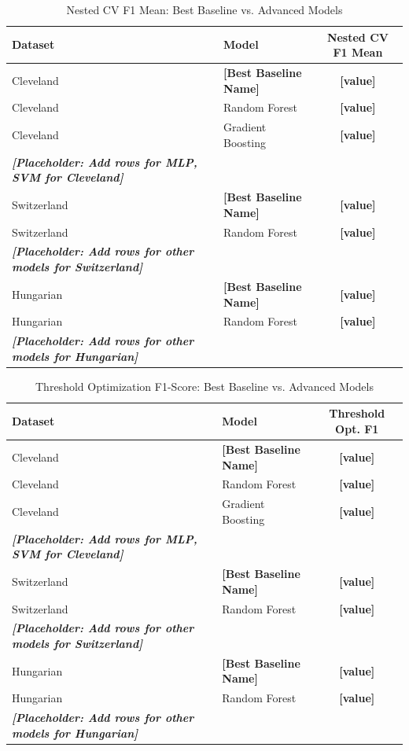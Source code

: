 \documentclass{article}
\begin{document}
\begin{table}[htbp] %
\centering
\caption{Nested CV F1 Mean: Best Baseline vs. Advanced Models}
\label{tab:advanced_comparison_nested}
\begin{tabular}{llc}
\toprule
Dataset     & Model                & Nested CV F1 Mean \\
\midrule
Cleveland   & \textbf{[Best Baseline Name]} & \textbf{[value]}    \\
Cleveland   & Random Forest        & \textbf{[value]}    \\
Cleveland   & Gradient Boosting    & \textbf{[value]}    \\
\textit{\textbf{[Placeholder: Add rows for MLP, SVM for Cleveland]}} & & \\
\midrule
Switzerland & \textbf{[Best Baseline Name]} & \textbf{[value]}    \\
Switzerland & Random Forest        & \textbf{[value]}    \\
\textit{\textbf{[Placeholder: Add rows for other models for Switzerland]}} & & \\
\midrule
Hungarian   & \textbf{[Best Baseline Name]} & \textbf{[value]}    \\
Hungarian   & Random Forest        & \textbf{[value]}    \\
\textit{\textbf{[Placeholder: Add rows for other models for Hungarian]}} & & \\
\bottomrule
\end{tabular}
\end{table}

\begin{table}[htbp] %
\centering
\caption{Threshold Optimization F1-Score: Best Baseline vs. Advanced Models}
\label{tab:advanced_comparison_thresh_opt}
\begin{tabular}{llc}
\toprule
Dataset     & Model                & Threshold Opt. F1 \\
\midrule
Cleveland   & \textbf{[Best Baseline Name]} & \textbf{[value]}    \\
Cleveland   & Random Forest        & \textbf{[value]}    \\
Cleveland   & Gradient Boosting    & \textbf{[value]}    \\
\textit{\textbf{[Placeholder: Add rows for MLP, SVM for Cleveland]}} & & \\
\midrule
Switzerland & \textbf{[Best Baseline Name]} & \textbf{[value]}    \\
Switzerland & Random Forest        & \textbf{[value]}    \\
\textit{\textbf{[Placeholder: Add rows for other models for Switzerland]}} & & \\
\midrule
Hungarian   & \textbf{[Best Baseline Name]} & \textbf{[value]}    \\
Hungarian   & Random Forest        & \textbf{[value]}    \\
\textit{\textbf{[Placeholder: Add rows for other models for Hungarian]}} & & \\
\bottomrule
\end{tabular}
\end{table}
\end{document}
